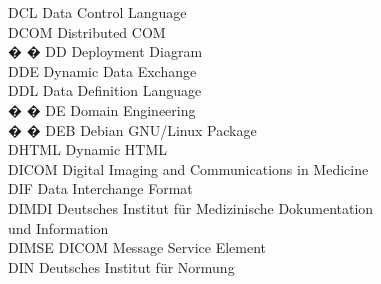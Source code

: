 \begin{tabbing}

    \>DCL \>\>Data Control Language\\

    \>DCOM \>\>Distributed COM\\

� � \>DD \>\>Deployment Diagram\\

    \>DDE \>\>Dynamic Data Exchange\\

    \>DDL \>\>Data Definition Language\\



� � \>DE \>\>Domain Engineering\\

� � \>DEB \>\>Debian GNU/Linux Package\\



    \>DHTML \>\>Dynamic HTML\\

    \>DICOM \>\>Digital Imaging and Communications in Medicine\\

    \>DIF \>\>Data Interchange Format\\

    \>DIMDI \>\>Deutsches Institut f\"{u}r Medizinische Dokumentation\\
        \>\>\>und Information\\

    \>DIMSE \>\>DICOM Message Service Element\\

    \>DIN \>\>Deutsches Institut f\"{u}r Normung\\




\end{tabbing}
